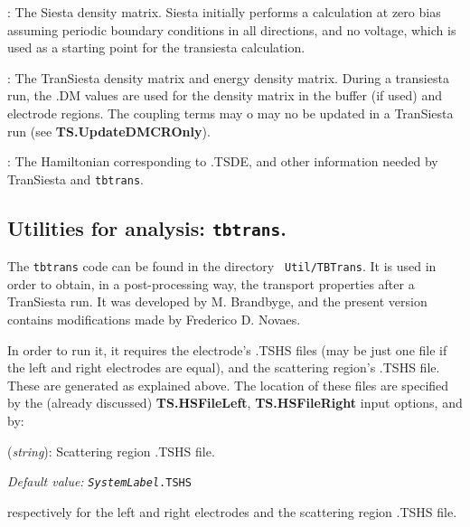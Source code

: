 \documentclass[11pt]{article}
\begin{document}
\begin{description}
    \itemsep 10pt
    \parsep 0pt
    
    \item[{\bf .DM }]:  The {\sc Siesta} density
      matrix. {\sc Siesta} initially performs a calculation at zero
      bias assuming periodic boundary conditions in all directions,
      and no voltage, which is used as a starting point for the
      transiesta calculation.

    \item[{\bf .TSDE }]:  The {\sc
      TranSiesta} density matrix and energy density matrix. During a
      transiesta run, the .DM values are used for the density matrix
      in the buffer (if used) and electrode regions. The coupling
      terms may o may no be updated in a {\sc TranSiesta} run (see
      {\bf TS.UpdateDMCROnly}).

    \item[{\bf .TSHS }]:  The Hamiltonian
      corresponding to .TSDE, and other information needed by {\sc
        TranSiesta} and {\tt tbtrans}.

\end{description} 

\subsection{Utilities for analysis: {\tt tbtrans}.}

The {\tt tbtrans} code can be found in the directory {\tt
  Util/TBTrans}.  It is used in order to obtain, in a post-processing
way, the transport properties after a {\sc TranSiesta} run. It was
developed by M. Brandbyge, and the present version contains
modifications made by Frederico D. Novaes.

In order to run it, it requires the electrode's .TSHS files (may be
just one file if the left and right electrodes are equal), and the
scattering region's .TSHS file.  These are generated as explained
above.  The location of these files are specified by the (already
discussed) {\bf TS.HSFileLeft}, {\bf TS.HSFileRight} input options,
and by:
\begin{description}
    \itemsep 10pt
    \parsep 0pt

\item [{\bf TS.TBT.HSFile}]({\it string}): Scattering region .TSHS file.

{\it Default value:} {\tt {\it SystemLabel}.TSHS}
\end{description}
respectively for the left and right electrodes and the scattering
region .TSHS file.
\end{document}

